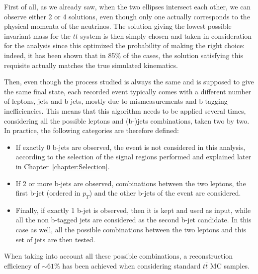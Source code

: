 \documentclass[a4paper, 10pt, openright]{report}
\begin{document}
First of all, as we already saw, when the two ellipses intersect each other, we can observe either 2 or 4 solutions, even though only one actually corresponds to the physical momenta of the neutrinos. The solution giving the lowest possible invariant mass for the $t \bar t$ system is then simply chosen and taken in consideration for the analysis since this optimized the probability of making the right choice: indeed, it has been shown \cite{rightChoice} that in 85\% of the cases, the solution satisfying this requisite actually matches the true simulated kinematics.

Then, even though the process studied is always the same and is supposed to give the same final state, each recorded event typically comes with a different number of leptons, jets and b-jets, mostly due to mismeasurements and b-tagging inefficiencies. This means that this algorithm needs to be applied several times, considering all the possible leptons and (b-)jets combinations, taken two by two. In practice, the following categories are therefore defined: 
\begin{itemize}
\item If exactly 0 b-jets are observed, the event is not considered in this analysis, according to the selection of the signal regions performed and explained later in Chapter~\ref{chapter:Selection}.
\item If 2 or more b-jets are observed, combinations between the two leptons, the first b-jet (ordered in $p_T$) and the other b-jets of the event are considered.
\item Finally, if exactly 1 b-jet is observed, then it is kept and used as input, while all the non b-tagged jets are considered as the second b-jet candidate. In this case as well, all the possible combinations between the two leptons and this set of jets are then tested.
\end{itemize}

When taking into account all these possible combinations, a reconstruction efficiency of $\sim 61$\% has been achieved when considering standard $t \bar t$ \ac{MC} samples. 
\end{document}
